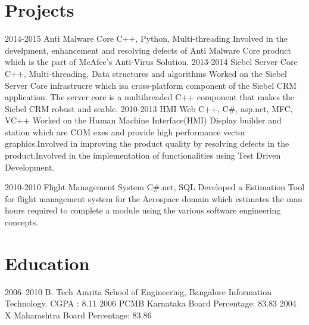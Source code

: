 \documentclass[]{kartikkumar-cv}
\begin{document}
\section{Projects}

\begin{entrylist}
  \entry
    {2014-2015}
    {Anti Malware Core}
    {C++, Python, Multi-threading}
    {Involved in the develpment, enhancement and resolving defects of Anti
    Malware Core product which is the part of McAfee's Anti-Virus Solution.}
  \entry
    {2013-2014}
    {Siebel Server Core}
    {C++, Multi-threading, Data structures and algorithms }
    {Worked on the Siebel Server Core infrastrucre which isa cross-platform
    component of the Siebel CRM application. The server core is a multihreaded
    C++ component that makes the Siebel CRM robust and scable.}
  \entry
    {2010-2013}
    {HMI Web}
    {C++, C\#, asp.net, MFC, VC++}
    {Worked on the Human Machine Interface(HMI) Display builder and station
    which are COM exes and provide high performance vector graphics.Involved in improving the product quality by resolving defects in the product.Involved in the implementation of functionalities using Test Driven
    Development.}
    
  \entry
  {2010-2010}
  {Flight Management System}
  {C\#.net, SQL}
  {Developed a Estimation Tool for flight management system for the
  Aerospace domain which estimates the man hours required to complete a
  module using the various software engineering concepts.}
    
\end{entrylist}


\section{Education}

\begin{entrylist}
  \entry
    {2006–2010}
    {B. Tech }
    {Amrita School of Engineering, Bangalore}
    {Information Technology. CGPA : 8.11}
  \entry
    {2006}
    {PCMB}
    {Karnataka Board}
    {Percentage: 83.83}
  \entry
    {2004}
    {X}
    {Maharashtra Board}
    {Percentage: 83.86}
\end{entrylist}
\end{document}
